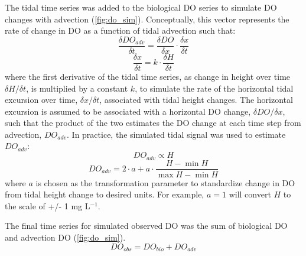 \documentclass{article}\usepackage[]{graphicx}\usepackage[]{color}
\begin{document}
The tidal time series was added to the biological DO series to simulate DO changes with advection (\cref{fig:do_sim}). Conceptually, this vector represents the rate of change in DO as a function of tidal advection such that:
\begin{equation}
\frac{\delta DO_{adv}}{\delta t} = \frac{\delta DO}{\delta x} \cdot \frac{\delta x}{\delta t}
\end{equation}
\begin{equation}
\frac{\delta x}{\delta t} = k \cdot \frac{\delta H}{\delta t}
\end{equation}
where the first derivative of the tidal time series, as change in height over time $\delta H / \delta t$, is multiplied by a constant $k$, to simulate the rate of the horizontal tidal excursion over time, $\delta x / \delta t$,  associated with tidal height changes.  The horizontal excursion is assumed to be associated with a horizontal DO change, $\delta DO / \delta x$, such that the product of the two estimates the DO change at each time step from advection, $DO_{adv}$. In practice, the simulated tidal signal was used to estimate $DO_{adv}$:
\begin{equation}
DO_{adv} \propto H
\end{equation}
\begin{equation}
DO_{adv} = 2\cdot a + a \cdot \frac{H- \min H}{\max H - \min H}
\end{equation}
where $a$ is chosen as the transformation parameter to standardize change in DO from tidal height change to desired units.  For example, $a = 1$ will convert $H$ to the scale of +/- 1 mg L$^{-1}$.  

The final time series for simulated observed DO was the sum of biological DO and advection DO (\cref{fig:do_sim}).
\begin{equation}
DO_{obs} = DO_{bio} + DO_{adv}
\end{equation}
\end{document}

